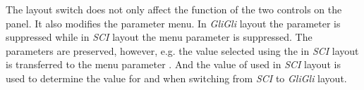 The layout switch does not only affect the function of the two controls on the panel. It also modifies the parameter menu. In \textit{GliGli} layout the parameter \drive is suppressed while in \textit{SCI} layout the menu parameter \glide is suppressed. The parameters are preserved, however, e.g. the value selected using the \glidepot in \textit{SCI} layout is transferred to the menu parameter \glide. And the value of \drive used in \textit{SCI} layout is used to determine the value for \vola and \volb when switching from \textit{SCI} to \textit{GliGli} layout. 

